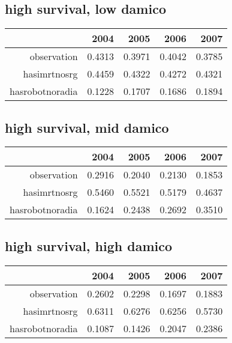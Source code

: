 \documentclass[12pt]{report}
\begin{document}
\subsection{high survival, low damico}
\begin{table}[ht]
\begin{center}
\begin{tabular}{rrrrr}
  \hline
 & 2004 & 2005 & 2006 & 2007 \\ 
  \hline
observation & 0.4313 & 0.3971 & 0.4042 & 0.3785 \\ 
  hasimrtnosrg & 0.4459 & 0.4322 & 0.4272 & 0.4321 \\ 
  hasrobotnoradia & 0.1228 & 0.1707 & 0.1686 & 0.1894 \\ 
   \hline
\end{tabular}
\end{center}
\end{table}


\subsection{high survival, mid damico}
\begin{table}[ht]
\begin{center}
\begin{tabular}{rrrrr}
  \hline
 & 2004 & 2005 & 2006 & 2007 \\ 
  \hline
observation & 0.2916 & 0.2040 & 0.2130 & 0.1853 \\ 
  hasimrtnosrg & 0.5460 & 0.5521 & 0.5179 & 0.4637 \\ 
  hasrobotnoradia & 0.1624 & 0.2438 & 0.2692 & 0.3510 \\ 
   \hline
\end{tabular}
\end{center}
\end{table}
\subsection{high survival, high damico}
\begin{table}[ht]
\begin{center}
\begin{tabular}{rrrrr}
  \hline
 & 2004 & 2005 & 2006 & 2007 \\ 
  \hline
observation & 0.2602 & 0.2298 & 0.1697 & 0.1883 \\ 
  hasimrtnosrg & 0.6311 & 0.6276 & 0.6256 & 0.5730 \\ 
  hasrobotnoradia & 0.1087 & 0.1426 & 0.2047 & 0.2386 \\ 
   \hline
\end{tabular}
\end{center}
\end{table}
\end{document}
